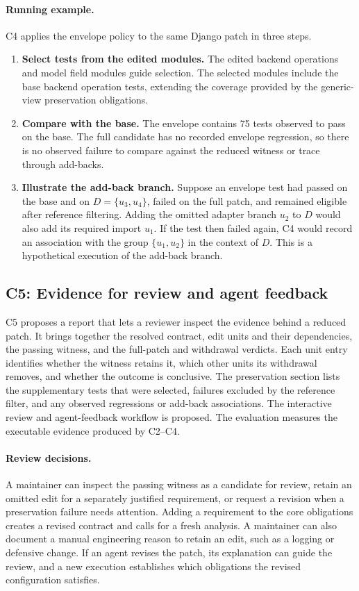 \documentclass[a4paper,fleqn]{cas-sc}
\begin{document}
\paragraph{Running example.} C4 applies the envelope policy to the same Django patch in three steps.
\begin{enumerate}
\item \textbf{Select tests from the edited modules.} The edited backend operations and model field modules guide selection. The selected modules include the base backend operation tests, extending the coverage provided by the generic-view preservation obligations.
\item \textbf{Compare with the base.} The envelope contains 75 tests observed to pass on the base. The full candidate has no recorded envelope regression, so there is no observed failure to compare against the reduced witness or trace through add-backs.
\item \textbf{Illustrate the add-back branch.} Suppose an envelope test had passed on the base and on $D=\{u_3,u_4\}$, failed on the full patch, and remained eligible after reference filtering. Adding the omitted adapter branch $u_2$ to $D$ would also add its required import $u_1$. If the test then failed again, C4 would record an association with the group $\{u_1,u_2\}$ in the context of $D$. This is a hypothetical execution of the add-back branch.
\end{enumerate}

\subsection{C5: Evidence for review and agent feedback}\label{sec:review}

C5 proposes a report that lets a reviewer inspect the evidence behind a reduced patch. It brings together the resolved contract, edit units and their dependencies, the passing witness, and the full-patch and withdrawal verdicts. Each unit entry identifies whether the witness retains it, which other units its withdrawal removes, and whether the outcome is conclusive. The preservation section lists the supplementary tests that were selected, failures excluded by the reference filter, and any observed regressions or add-back associations. The interactive review and agent-feedback workflow is proposed. The evaluation measures the executable evidence produced by C2--C4.

\paragraph{Review decisions.} A maintainer can inspect the passing witness as a candidate for review, retain an omitted edit for a separately justified requirement, or request a revision when a preservation failure needs attention. Adding a requirement to the core obligations creates a revised contract and calls for a fresh analysis. A maintainer can also document a manual engineering reason to retain an edit, such as a logging or defensive change. If an agent revises the patch, its explanation can guide the review, and a new execution establishes which obligations the revised configuration satisfies.
\end{document}
